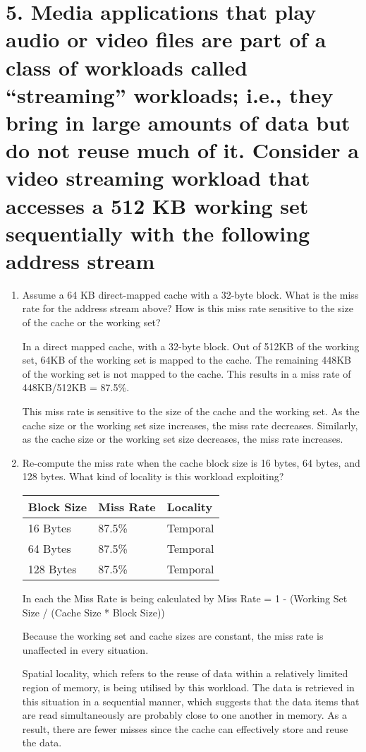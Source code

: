 \documentclass[11pt]{article}
\newenvironment{qparts}{\begin{enumerate}[{(}a{)}]}{\end{enumerate}}
\begin{document}
\newpage

\section*{5. Media applications that play audio or video files are part of a class of workloads called “streaming” workloads; i.e., they bring in large amounts of data but do not reuse much of it. Consider a video streaming workload that accesses a 512 KB working set sequentially with the following address stream}

\begin{qparts}
    \item Assume a 64 KB direct-mapped cache with a 32-byte block. What is the miss rate for the address stream above? How is this miss rate sensitive to the size of the cache or the working set?
    
    In a direct mapped cache, with a 32-byte block. Out of 512KB of the working set, 64KB of the working set is mapped to the cache. The remaining 448KB of the working set is not mapped to the cache. This results in a miss rate of 448KB/512KB = 87.5\%.

    This miss rate is sensitive to the size of the cache and the working set. As the cache size or the working set size increases, the miss rate decreases. Similarly, as the cache size or the working set size decreases, the miss rate increases.

    \item Re-compute the miss rate when the cache block size is 16 bytes, 64 bytes, and 128 bytes. What kind of locality is this workload exploiting?
    
    \begin{tabular}{|l|l|l|}
    \hline
    Block Size & Miss Rate & Locality \\ \hline
    16 Bytes   & 87.5\%    & Temporal \\ \hline
    64 Bytes   & 87.5\%    & Temporal \\ \hline
    128 Bytes  & 87.5\%    & Temporal \\ \hline
    \end{tabular}

    In each the Miss Rate is being calculated by 
    Miss Rate = 1 - (Working Set Size / (Cache Size * Block Size))

    Because the working set and cache sizes are constant, the miss rate is unaffected in every situation.

    Spatial locality, which refers to the reuse of data within a relatively limited region of memory, is being utilised by this workload. The data is retrieved in this situation in a sequential manner, which suggests that the data items that are read simultaneously are probably close to one another in memory. As a result, there are fewer misses since the cache can effectively store and reuse the data.

\end{qparts}
\end{document}
